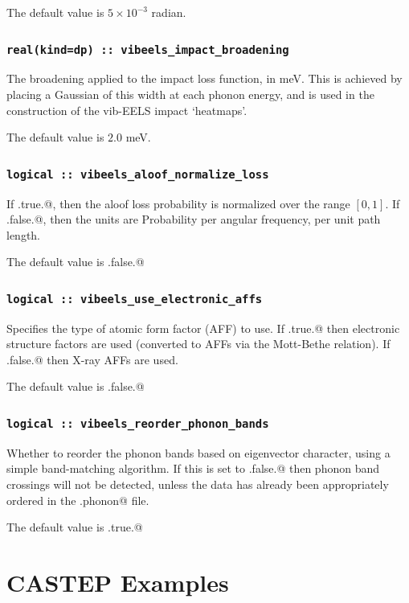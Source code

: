 \documentclass[a4paper,11pt,twoside]{book}
\begin{document}
{The default value is $5 \times 10^{-3}$ radian.

\subsection[vibeels\_impact\_broadening]{\tt real(kind=dp) :: vibeels\_impact\_broadening}

The broadening applied to the impact loss function, in meV. This is achieved by placing a Gaussian of this width at each phonon energy, and is used in the construction of the vib-EELS impact `heatmaps'.

The default value is $2.0$ meV.

\subsection[vibeels\_aloof\_normalize\_loss]{\tt logical :: vibeels\_aloof\_normalize\_loss}

If \verb@.true.@, then the aloof loss probability is normalized over the range $[0,1]$. If \verb@.false.@, then the units are Probability per angular frequency, per unit path length.

The default value is \verb@.false.@

\subsection[vibeels\_use\_electronic\_affs]{\tt logical :: vibeels\_use\_electronic\_affs}

Specifies the type of atomic form factor (AFF) to use. If \verb@.true.@ then electronic structure factors are used (converted to AFFs via the Mott-Bethe relation). If \verb@.false.@ then X-ray AFFs are used.

The default value is \verb@.false.@

\subsection[vibeels\_reorder\_phonon\_bands]{\tt logical :: vibeels\_reorder\_phonon\_bands}

Whether to reorder the phonon bands based on eigenvector character, using a simple band-matching algorithm. If this is set to \verb@.false.@ then phonon band crossings will not be detected, unless the data has already been appropriately ordered in the \verb@.phonon@ file.

The default value is \verb@.true.@

\chapter{CASTEP Examples}

}
\end{document}
